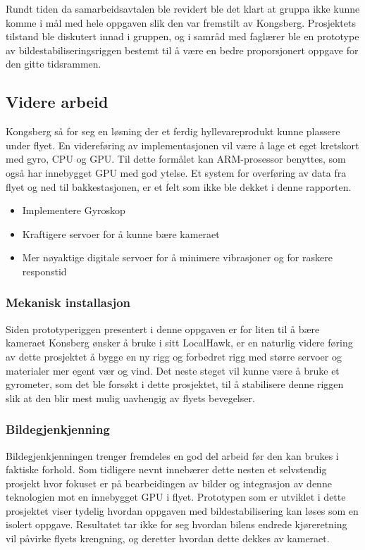 Rundt tiden da samarbeidsavtalen ble revidert ble det klart at gruppa ikke kunne komme i mål med hele oppgaven slik den var fremstilt av Kongsberg. Prosjektets tilstand ble diskutert innad i gruppen, og i samråd med faglærer ble en prototype av bildestabiliseringsriggen bestemt til å være en bedre proporsjonert oppgave for den gitte tidsrammen.

\subsection{Videre arbeid}

Kongsberg så for seg en løsning der et ferdig hyllevareprodukt kunne plassere under flyet. En videreføring av implementasjonen vil være å lage et eget kretskort med gyro, CPU og GPU. Til dette formålet kan ARM-prosessor benyttes, som også har innebygget GPU med god ytelse. Et system for overføring av data fra flyet og ned til bakkestasjonen, er et felt som ikke ble dekket i denne rapporten. 

\begin{itemize}

\item Implementere Gyroskop



\item Kraftigere servoer for å kunne bære kameraet



\item Mer nøyaktige digitale servoer for å minimere vibrasjoner og for raskere responstid

\end{itemize} 

\subsubsection{Mekanisk installasjon}

Siden prototyperiggen presentert i denne oppgaven er for liten til å bære kameraet Konsberg ønsker å bruke i sitt LocalHawk, er en naturlig videre føring av dette prosjektet å bygge en ny rigg og forbedret rigg med større servoer og materialer mer egent vær og vind. Det neste steget vil kunne være å bruke et gyrometer, som det ble forsøkt i dette prosjektet, til å stabilisere denne riggen slik at den blir mest mulig uavhengig av flyets bevegelser. 

\subsubsection{Bildegjenkjenning}
Bildegjenkjenningen trenger fremdeles en god del arbeid før den kan brukes i faktiske forhold. Som tidligere nevnt innebærer dette nesten et selvstendig prosjekt hvor fokuset er på bearbeidingen av bilder og integrasjon av denne teknologien mot en innebygget GPU i flyet. Prototypen som er utviklet i dette prosjektet viser tydelig hvordan oppgaven med bildestabilisering kan løses som en isolert oppgave. Resultatet tar ikke for seg hvordan bilens endrede kjøreretning vil påvirke flyets krengning, og deretter hvordan dette dekkes av kameraet.

